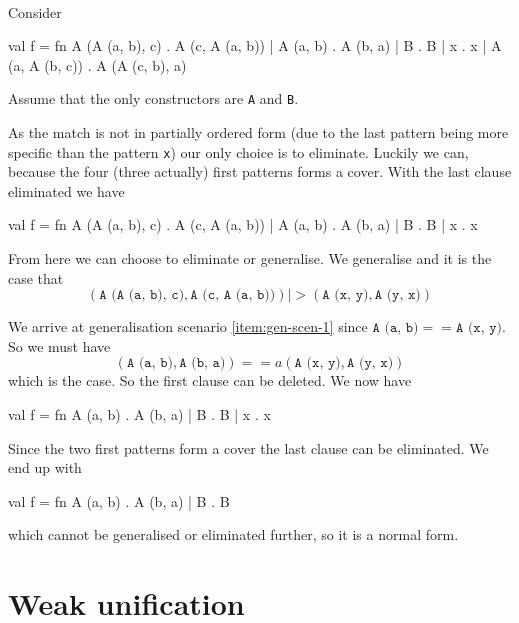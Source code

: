 \begin{example}\ \\
Consider 
\begin{sml}
val f = 
fn A (A (a, b), c) . A (c, A (a, b))
 | A (a, b)        . A (b, a)
 | B               . B
 | x               . x
 | A (a, A (b, c))  . A (A (c, b), a)
\end{sml}
Assume that the only constructors are \texttt{A} and \texttt{B}.

As the match is not in partially ordered form (due to the last pattern being
more specific than the pattern \texttt{x}) our only choice is to
eliminate. Luckily we can, because the four (three actually) first patterns
forms a cover. With the last clause eliminated we have

\begin{sml}
val f = 
fn A (A (a, b), c) . A (c, A (a, b))
 | A (a, b)        . A (b, a)
 | B               . B
 | x               . x
\end{sml}

From here we can choose to eliminate or generalise. We generalise and it is the
case that
\[
(\texttt{A (A (a, b), c)}, \texttt{A (c, A (a, b))}) |> (\texttt{A (x, y)},
\texttt{A (y, x)})
\]

We arrive at generalisation scenario \ref{item:gen-scen-1} since $\texttt{A (a, b)} ==
\texttt{A (x, y)}$. So we must have 
\[ 
(\texttt{A (a, b)}, \texttt{A (b, a)}) 
==a (\texttt{A (x, y)}, \texttt{A (y, x)})
\]
which is the case. So the first clause can be deleted. We now have

\begin{sml}
val f = 
fn A (a, b) . A (b, a)
 | B        . B
 | x        . x
\end{sml}

Since the two first patterns form a cover the last clause can be eliminated. We
end up with

\begin{sml}
val f = 
fn A (a, b) . A (b, a)
 | B        . B
\end{sml}

which cannot be generalised or eliminated further, so it is a normal form.
\end{example}


\section{Weak unification}



